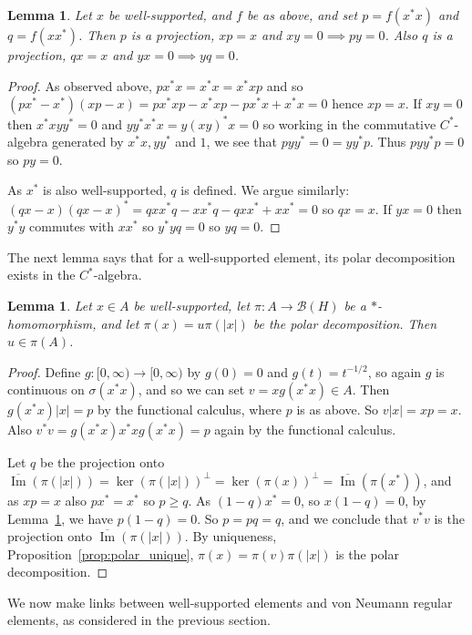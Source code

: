 \documentclass[twoside,a4paper,12pt]{article}
\theoremstyle{plain}
\newtheorem{lemma}[proposition]{Lemma}
\theoremstyle{definition}
\newcommand{\mc}{\mathcal}
\newcommand{\im}{\operatorname{Im}}
\begin{document}
\begin{lemma}\label{lem:ws_projs}
Let $x$ be well-supported, and $f$ be as above, and set $p = f(x^*x)$ and $q = f(xx^*)$.  Then $p$ is a projection, $xp=x$ and $xy=0 \implies py=0$.  Also $q$ is a projection, $qx=x$ and $yx=0 \implies yq=0$.
\end{lemma}
\begin{proof}
As observed above, $px^*x = x^*x = x^*xp$ and so $(px^*-x^*)(xp-x) = px^*xp - x^*xp - px^*x + x^*x = 0$ hence $xp = x$.  If $xy = 0$ then $x^*x yy^* = 0$ and $yy^* x^*x = y (xy)^* x = 0$ so working in the commutative $C^*$-algebra generated by $x^*x, yy^*$ and $1$, we see that $p yy^* = 0 = yy^*p$.  Thus $pyy^*p =0$ so $py=0$.

As $x^*$ is also well-supported, $q$ is defined.  We argue similarly: $(qx-x)(qx-x)^* = qxx^*q - xx^*q - qxx^* + xx^* = 0$ so $qx=x$.  If $yx=0$ then $y^*y$ commutes with $xx^*$ so $y^*yq = 0$ so $yq=0$.
\end{proof}

The next lemma says that for a well-supported element, its polar decomposition exists in the $C^*$-algebra.

\begin{lemma}\label{lem:ws_pd}
Let $x\in A$ be well-supported, let $\pi \colon A \to \mc B(H)$ be a $*$-homomorphism, and let $\pi(x) = u\pi(|x|)$ be the polar decomposition.  Then $u\in\pi(A)$.
\end{lemma}
\begin{proof}
Define $g \colon [0,\infty) \to [0,\infty)$ by $g(0)=0$ and $g(t) = t^{-1/2}$, so again $g$ is continuous on $\sigma(x^*x)$, and so we can set $v = x g(x^*x) \in A$.  Then $g(x^*x) |x| = p$ by the functional calculus, where $p$ is as above.  So $v|x| = xp = x$.  Also $v^*v = g(x^*x) x^*x g(x^*x) = p$ again by the functional calculus.

Let $q$ be the projection onto $\overline{\im}(\pi(|x|)) = \ker(\pi(|x|))^\perp = \ker(\pi(x))^\perp = \overline{\im}(\pi(x^*))$, and as $xp=x$ also $px^*=x^*$ so $p\geq q$.  As $(1-q)x^*=0$, so $x(1-q)=0$, by Lemma~\ref{lem:ws_projs}, we have $p(1-q)=0$.  So $p = pq = q$, and we conclude that $v^*v$ is the projection onto $\overline{\im}(\pi(|x|))$.  By uniqueness, Proposition~\ref{prop:polar_unique}, $\pi(x) = \pi(v) \pi(|x|)$ is the polar decomposition.
\end{proof}

We now make links between well-supported elements and von Neumann regular elements, as considered in the previous section.
\end{document}
